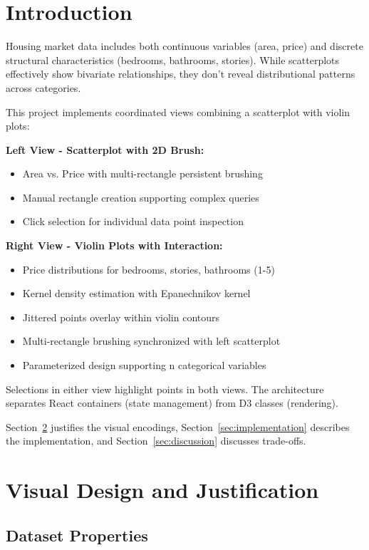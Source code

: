 \documentclass[sigplan,screen]{acmart}
\begin{document}
\section{Introduction}

Housing market data includes both continuous variables (area, price)
and discrete structural characteristics (bedrooms, bathrooms, stories).
While scatterplots effectively show bivariate relationships, they don't
reveal distributional patterns across categories.

This project implements coordinated views combining a scatterplot with
violin plots:

\textbf{Left View - Scatterplot with 2D Brush:}
\begin{itemize}
\item Area vs. Price with multi-rectangle persistent brushing
\item Manual rectangle creation supporting complex queries
\item Click selection for individual data point inspection
\end{itemize}

\textbf{Right View - Violin Plots with Interaction:}
\begin{itemize}
\item Price distributions for bedrooms, stories, bathrooms (1-5)
\item Kernel density estimation with Epanechnikov kernel
\item Jittered points overlay within violin contours
\item Multi-rectangle brushing synchronized with left scatterplot
\item Parameterized design supporting n categorical variables
\end{itemize}

Selections in either view highlight points in both views. The
architecture separates React containers (state management) from D3
classes (rendering).

Section~\ref{sec:design} justifies the visual encodings,
Section~\ref{sec:implementation} describes the implementation, and
Section~\ref{sec:discussion} discusses trade-offs.

\section{Visual Design and Justification}
\label{sec:design}

\subsection{Dataset Properties}
\end{document}
